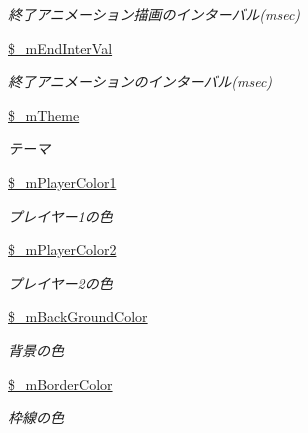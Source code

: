 \begin{DoxyCompactItemize}
\begin{DoxyCompactList}\small\item\em 終了アニメーション描画のインターバル(msec) \end{DoxyCompactList}\item 
\mbox{\label{class_reversi_setting_a9a7c91b280df7302a2545e8249f7a98b}} 
\hyperlink{class_reversi_setting_a9a7c91b280df7302a2545e8249f7a98b}{\$\+\_\+m\+End\+Inter\+Val}
\begin{DoxyCompactList}\small\item\em 終了アニメーションのインターバル(msec) \end{DoxyCompactList}\item 
\mbox{\label{class_reversi_setting_a473e416a1757c023d7bd59a5ea12b12a}} 
\hyperlink{class_reversi_setting_a473e416a1757c023d7bd59a5ea12b12a}{\$\+\_\+m\+Theme}
\begin{DoxyCompactList}\small\item\em テーマ \end{DoxyCompactList}\item 
\mbox{\label{class_reversi_setting_a8e0bf25cff29a3743b30c7a6d17a4855}} 
\hyperlink{class_reversi_setting_a8e0bf25cff29a3743b30c7a6d17a4855}{\$\+\_\+m\+Player\+Color1}
\begin{DoxyCompactList}\small\item\em プレイヤー1の色 \end{DoxyCompactList}\item 
\mbox{\label{class_reversi_setting_a15cb29ead1e4f1bb90eb82819317ea87}} 
\hyperlink{class_reversi_setting_a15cb29ead1e4f1bb90eb82819317ea87}{\$\+\_\+m\+Player\+Color2}
\begin{DoxyCompactList}\small\item\em プレイヤー2の色 \end{DoxyCompactList}\item 
\mbox{\label{class_reversi_setting_a69c86bb449573ccc89975e29066e71d7}} 
\hyperlink{class_reversi_setting_a69c86bb449573ccc89975e29066e71d7}{\$\+\_\+m\+Back\+Ground\+Color}
\begin{DoxyCompactList}\small\item\em 背景の色 \end{DoxyCompactList}\item 
\mbox{\label{class_reversi_setting_a901c34066dafa1810c09bc3037e692f6}} 
\hyperlink{class_reversi_setting_a901c34066dafa1810c09bc3037e692f6}{\$\+\_\+m\+Border\+Color}
\begin{DoxyCompactList}\small\item\em 枠線の色 \end{DoxyCompactList}\end{DoxyCompactItemize}


